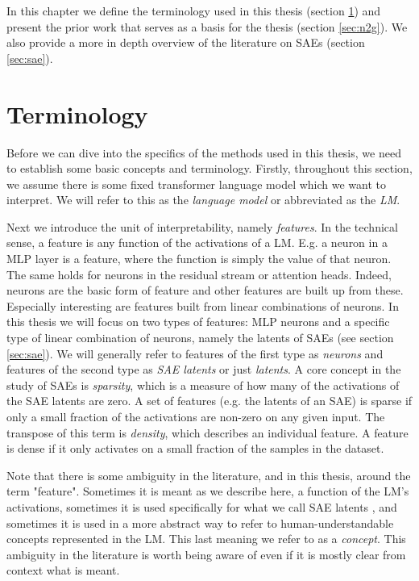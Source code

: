 In this chapter we define the terminology used in this thesis (section \ref{sec:preliminaries}) and present the prior work that serves as a basis for the thesis (section \ref{sec:n2g}).
We also provide a more in depth overview of the literature on \acp{SAE} (section \ref{sec:sae}).

\section{Terminology}
\label{sec:preliminaries}
Before we can dive into the specifics of the methods used in this thesis, 
we need to establish some basic concepts and terminology.
Firstly, throughout this section, we assume there is some fixed 
transformer language model \parencite{vaswani_attention_2023} 
which we want to interpret.
We will refer to this as the \emph{language model} or abbreviated as the \emph{LM}.

Next we introduce the unit of interpretability, namely \emph{features}. 
In the technical sense, a feature is any function of the activations 
of a \ac{LM}.
E.g. a neuron in a \ac{MLP} layer is a feature, where the function is simply the value of that neuron.
The same holds for neurons in the residual stream or attention heads.
Indeed, neurons are the basic form of feature and other features are built up from these.
Especially interesting are features built from linear combinations of neurons.
In this thesis we will focus on two types of features:
\Ac{MLP} neurons and a specific type of linear combination of neurons, namely the latents of \acp{SAE} (see section \ref{sec:sae}).
We will generally refer to features of the first type as \emph{neurons} and features of the second type as \emph{SAE latents} or just \emph{latents}.
A core concept in the study of \acp{SAE} is \emph{sparsity}, which is a measure of how many of the activations of the \ac{SAE} latents are zero.
A set of features (e.g. the latents of an SAE) is sparse if only a small fraction of the activations are non-zero on any given input.
The transpose of this term is \emph{density}, which describes an individual feature.
A feature is dense if it only activates on a small fraction of the samples in the dataset.

Note that there is some ambiguity in the literature, and in this thesis, around the term "feature".
Sometimes it is meant as we describe here, a function of the \ac{LM}'s activations, sometimes it is used specifically for what we call \ac{SAE} latents \parencite{templeton_scaling_2024}, and sometimes it is used in a more abstract way to refer to human-understandable concepts represented in the \ac{LM}.
This last meaning we refer to as a \emph{concept}.
This ambiguity in the literature is worth being aware of even if it is mostly clear from context what is meant.

